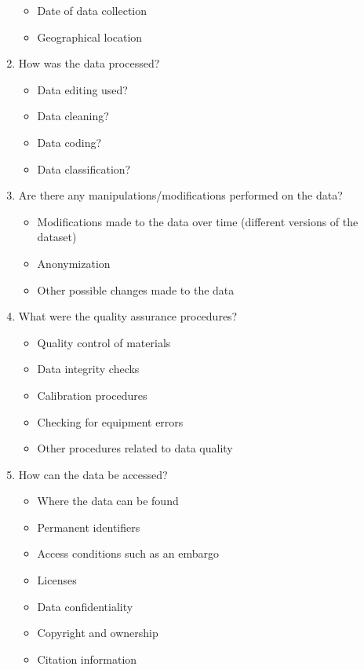 \begin{enumerate}
\begin{itemize}
				\item Date of data collection
				\item Geographical location
			\end{itemize}
		\item How was the data processed?
			\begin{itemize}
				\item Data editing used?
				\item Data cleaning?
				\item Data coding?
				\item Data classification?
			\end{itemize}
		\item Are there any manipulations/modifications performed on the data?
			\begin{itemize}
				\item Modifications made to the data over time (different versions of the dataset)
				\item Anonymization
				\item Other possible changes made to the data
			\end{itemize}
		\item What were the quality assurance procedures?
			\begin{itemize}
				\item Quality control of materials
				\item Data integrity checks
				\item Calibration procedures
				\item Checking for equipment errors
				\item Other procedures related to data quality
			\end{itemize}
		\item How can the data be accessed?
			\begin{itemize}
				\item Where the data can be found
				\item Permanent identifiers
				\item Access conditions such as an embargo
				\item Licenses
				\item Data confidentiality
				\item Copyright and ownership
				\item Citation information
			\end{itemize}
	\end{enumerate}
	
				
\whiteline
